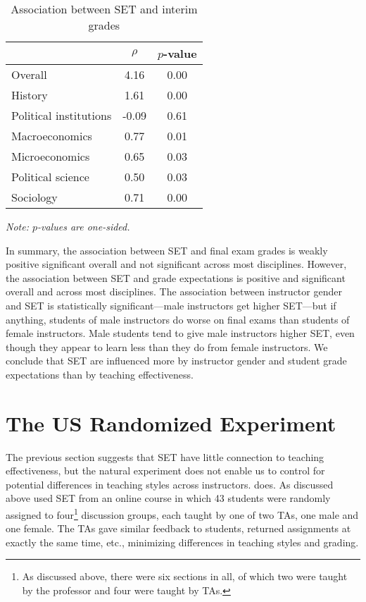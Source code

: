 \documentclass[12pt]{article}
\begin{document}
\begin{table}[htbp]
  \centering
  \footnotesize 
  \caption{Association between SET and interim grades}
    \begin{tabular}{lcc}
    \toprule 
                          & $\rho$  & $p$-value  \\
   \midrule
    Overall &                 4.16       & 0.00   \\
    History &                 1.61       & 0.00   \\
    Political institutions &  -0.09       & 0.61     \\
    Macroeconomics &          0.77       & 0.01    \\
    Microeconomics &          0.65       & 0.03     \\
    Political science &      0.50       & 0.03     \\
    Sociology &               0.71       & 0.00     \\
    \bottomrule
    \end{tabular}%
 \label{tab:instructor_gender}%
  
  \textit{Note: $p$-values are one-sided.}
\end{table}%
\normalsize

In summary, the association between SET and final exam grades is weakly positive significant overall and not significant across most disciplines. However, the association between SET and grade expectations is positive and significant overall and across most disciplines.
The association between instructor gender and SET is statistically significant---male instructors
get higher SET---but if anything, students of male instructors do worse on final exams
than students of female instructors.
Male students tend to give male instructors higher SET, even though they appear to learn less
than they do from female instructors.
We conclude that SET are influenced more by instructor gender and student grade expectations than
by teaching effectiveness.


\section{The US Randomized Experiment} \label{sec:US-results}

The previous section suggests that SET have little
connection to teaching effectiveness, but the natural experiment 
does not enable us to control for potential differences in teaching 
styles across instructors. 
\citet{MacNell2014} does.
As discussed above used SET from an online course in which 
43 students were randomly assigned to four\footnote{%
   As discussed above, there were six sections in all, of which two were taught by the professor and four
   were taught by TAs.
} 
discussion groups, each taught by one of two TAs, one male and one female. 
The TAs gave similar feedback to students, returned assignments at exactly the same time, etc., 
minimizing differences in teaching styles and grading.
\end{document}
